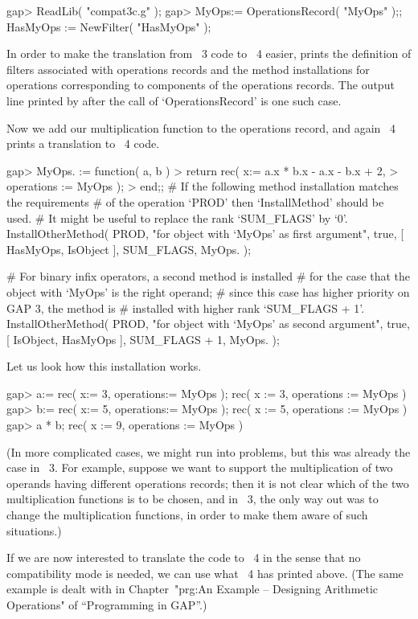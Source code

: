 \begintt
gap> ReadLib( "compat3c.g" );
gap> MyOps:= OperationsRecord( "MyOps" );;
HasMyOps := NewFilter( "HasMyOps" );
\endtt

In order to make the translation from {\GAP}~3 code to {\GAP}~4 easier,
{\GAP} prints the definition of filters associated with
operations records and the method installations for operations
corresponding to components of the operations records.
The output line printed by {\GAP} after the call of `OperationsRecord'
is one such case.

Now we add our multiplication function to the operations record,
and again {\GAP}~4 prints a translation to {\GAP}~4 code.

\begintt
gap> MyOps.\* := function( a, b )
>        return rec( x:= a.x * b.x - a.x - b.x + 2,
>                    operations := MyOps );
>    end;;
# If the following method installation matches the requirements
# of the operation `PROD' then `InstallMethod' should be used.
# It might be useful to replace the rank `SUM_FLAGS' by `0'.
InstallOtherMethod( PROD,
    "for object with `MyOps' as first argument",
    true,
    [ HasMyOps, IsObject ], SUM_FLAGS,
    MyOps.\* );

# For binary infix operators, a second method is installed
# for the case that the object with `MyOps' is the right operand;
# since this case has higher priority on GAP 3, the method is
# installed with higher rank `SUM_FLAGS + 1'.
InstallOtherMethod( PROD,
    "for object with `MyOps' as second argument",
    true,
    [ IsObject, HasMyOps ], SUM_FLAGS + 1,
    MyOps.\* );
\endtt

Let us look how this installation works.

\begintt
gap> a:= rec( x:= 3, operations:= MyOps );
rec( x := 3, operations := MyOps )
gap> b:= rec( x:= 5, operations:= MyOps );
rec( x := 5, operations := MyOps )
gap> a * b;
rec( x := 9, operations := MyOps )
\endtt

(In more complicated cases, we might run into problems,
but this was already the case in {\GAP}~3.
For example, suppose we want to support the multiplication of two
operands having different operations records;
then it is not clear which of the two multiplication functions
is to be chosen,
and in {\GAP}~3, the only way out was to change the
multiplication functions, in order to make them aware of
such situations.)

If we are now interested to translate the code to {\GAP}~4
in the sense that no compatibility mode is needed,
we can use what {\GAP}~4 has printed above.
(The same example is dealt with in
Chapter~"prg:An Example -- Designing Arithmetic Operations"
of ``Programming in GAP''.)

